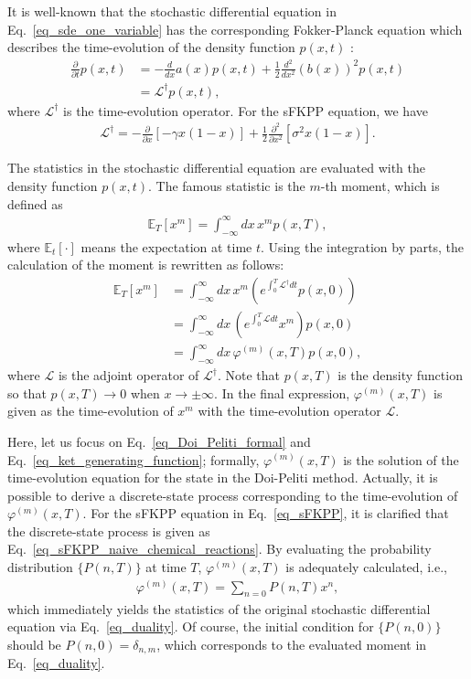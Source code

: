 \documentclass[sn-mathphys,Numbered]{sn-jnl}%
\theoremstyle{thmstyleone}%
\theoremstyle{thmstyletwo}%
\theoremstyle{thmstylethree}%
\begin{document}
It is well-known that the stochastic differential equation in Eq.~\eqref{eq_sde_one_variable} has the corresponding Fokker-Planck equation which describes the time-evolution of the density function $p(x,t)$ \cite{Gardiner2009,Risken1989}:
\begin{align}
\frac{\partial}{\partial t} p(x,t) &=
- \frac{d}{dx} a(x) p(x,t) + \frac{1}{2} \frac{d^2}{dx^2} \left( b(x) \right)^2 p(x,t) \nonumber \\
&= \mathcal{L}^\dagger p(x,t),
\end{align}
where $\mathcal{L}^\dagger$ is the time-evolution operator. For the sFKPP equation, we have
\begin{align}
\mathcal{L}^\dagger
= - \frac{\partial}{\partial x} 
\left[ - \gamma x(1-x) \right]
+ \frac{1}{2} \frac{\partial^2}{\partial x^2}
\left[ \sigma^2 x(1-x)  \right].
\label{eq_sFKPP_Fokker_Planck}
\end{align}

The statistics in the stochastic differential equation are evaluated with the density function $p(x,t)$. The famous statistic is the $m$-th moment, which is defined as
\begin{align}
\mathbb{E}_T \left[x^m \right] = \int_{-\infty}^\infty dx \,  x^m  p(x,T),
\end{align}
where $\mathbb{E}_t[\cdot]$ means the expectation at time $t$. Using the integration by parts, the calculation of the moment is rewritten as follows:
\begin{align}
\mathbb{E}_T[x^m]
&= \int_{-\infty}^\infty dx \, x^m \left( e^{\int_0^T \mathcal{L}^\dagger dt } p(x,0) \right) \nonumber \\
&= \int_{-\infty}^\infty dx \, \left( e^{\int_0^T \mathcal{L} dt }  x^m \right) p(x,0) \nonumber \\
&= \int_{-\infty}^\infty dx \, \varphi^{(m)}(x,T) p(x,0), 
\label{eq_duality}
\end{align}
where $\mathcal{L}$ is the adjoint operator of $\mathcal{L}^\dagger$. Note that $p(x,T)$ is the density function so that $p(x,T) \to 0$ when $x \to \pm \infty$. In the final expression, $\varphi^{(m)}(x,T)$ is given as the time-evolution of $x^m$ with the time-evolution operator $\mathcal{L}$. 

Here, let us focus on Eq.~\eqref{eq_Doi_Peliti_formal} and Eq.~\eqref{eq_ket_generating_function}; formally, $\varphi^{(m)}(x,T)$ is the solution of the time-evolution equation for the state in the Doi-Peliti method. Actually, it is possible to derive a discrete-state process corresponding to the time-evolution of $\varphi^{(m)}(x,T)$. For the sFKPP equation in Eq.~\eqref{eq_sFKPP}, it is clarified that the discrete-state process is given as Eq.~\eqref{eq_sFKPP_naive_chemical_reactions}. By evaluating the probability distribution $\{P(n,T)\}$ at time $T$, $\varphi^{(m)}(x,T)$ is adequately calculated, i.e.,
\begin{align}
\varphi^{(m)}(x,T) = \sum_{n=0} P(n,T) x^n,
\end{align}
which immediately yields the statistics of the original stochastic differential equation via Eq.~\eqref{eq_duality}. Of course, the initial condition for $\{P(n,0)\}$ should be $P(n,0) = \delta_{n,m}$, which corresponds to the evaluated moment in Eq.~\eqref{eq_duality}.
\end{document}
